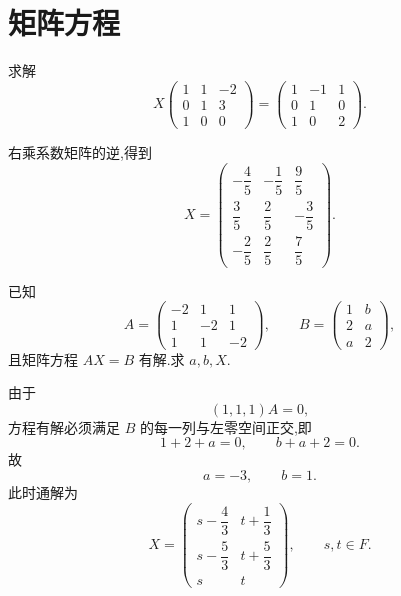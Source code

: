 \newpage

\section{矩阵方程}

\begin{example}
求解
\[
X
\begin{pmatrix}
1&1&-2\\
0&1&3\\
1&0&0
\end{pmatrix}
=
\begin{pmatrix}
1&-1&1\\
0&1&0\\
1&0&2
\end{pmatrix}.
\]
\end{example}
\exampleblank

\begin{solution}
右乘系数矩阵的逆,得到
\[
\boxed{
X=
\begin{pmatrix}
-\dfrac45&-\dfrac15&\dfrac95\\[4pt]
\dfrac35&\dfrac25&-\dfrac35\\[4pt]
-\dfrac25&\dfrac25&\dfrac75
\end{pmatrix}
}.
\]
\end{solution}

\begin{example}
已知
\[
A=
\begin{pmatrix}
-2&1&1\\
1&-2&1\\
1&1&-2
\end{pmatrix},
\qquad
B=
\begin{pmatrix}
1&b\\
2&a\\
a&2
\end{pmatrix},
\]
且矩阵方程 $AX=B$ 有解.求 $a,b,X$.
\end{example}
\exampleblank

\begin{solution}
由于
\[
(1,1,1)A=0,
\]
方程有解必须满足 $B$ 的每一列与左零空间正交,即
\[
1+2+a=0,
\qquad
b+a+2=0.
\]
故
\[
\boxed{a=-3,\qquad b=1}.
\]
此时通解为
\[
\boxed{
X=
\begin{pmatrix}
s-\dfrac43&t+\dfrac13\\[4pt]
s-\dfrac53&t+\dfrac53\\[4pt]
s&t
\end{pmatrix},
\qquad s,t\in F
}.
\]
\end{solution}

